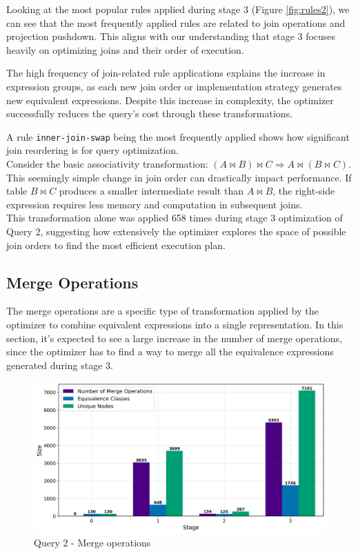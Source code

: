 \documentclass[a4paper,12pt]{scrreprt}
\begin{document}
Looking at the most popular rules applied during stage 3 (Figure \ref{fig:rules2}), we can see that the most frequently applied rules are related to join operations and projection pushdown. This aligns with our understanding that stage 3 focuses heavily on optimizing joins and their order of execution.

The high frequency of join-related rule applications explains the increase in expression groups, as each new join order or implementation strategy generates new equivalent expressions. Despite this increase in complexity, the optimizer successfully reduces the query's cost through these transformations.

A rule \texttt{inner-join-swap} being the most frequently applied shows how significant join reordering is for query optimization. \\

Consider the basic associativity transformation: $(A \bowtie B) \bowtie C \Rightarrow A \bowtie (B \bowtie C)$. This seemingly simple change in join order can drastically impact performance. If table $B \bowtie C$ produces a smaller intermediate result than $A \bowtie B$, the right-side expression requires less memory and computation in subsequent joins. \\
This transformation alone was applied 658 times during stage 3 optimization of Query 2, suggesting how extensively the optimizer explores the space of possible join orders to find the most efficient execution plan.

\subsection{Merge Operations}

The merge operations are a specific type of transformation applied by the optimizer to combine equivalent expressions into a single representation. In this section, it's expected to see a large increase in the number of merge operations, since the optimizer has to find a way to merge all the equivalence expressions generated during stage 3. \\


\begin{figure}[H]
    \centering
    \includegraphics[width=\linewidth]{img_merges/q2_sizes.png}
    \caption{Query 2 - Merge operations}
    \label{fig:hist2}
\end{figure}
\end{document}
